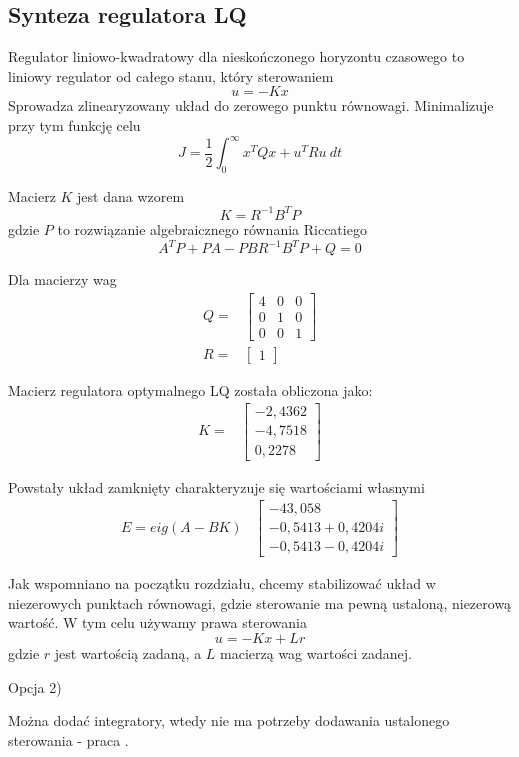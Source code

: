 \subsection{Synteza regulatora LQ}

Regulator liniowo-kwadratowy dla nieskończonego horyzontu czasowego to liniowy regulator od całego stanu, który sterowaniem
\begin{equation}
u = -Kx
\end{equation}
Sprowadza zlinearyzowany układ do zerowego punktu równowagi. Minimalizuje przy tym funkcję celu
\begin{equation}
J = \dfrac{1}{2} \int _0^{\infty} {x^T Q x + u^T R u}\: dt
\end{equation}

Macierz $K$ jest dana wzorem
\begin{equation}
K = R^{-1}B^T P
\end{equation}
gdzie $P$ to rozwiązanie algebraicznego równania Riccatiego
\begin{equation}
A^T P + PA -PBR^{-1}B^T P + Q = 0
\end{equation}

Dla macierzy wag
\[
\begin{array}{lc}
Q = &
\begin{bmatrix} 4 & 0 & 0 \\
0 & 1 & 0 \\
0 & 0 & 1
\end{bmatrix}
\\
R = & \begin{bmatrix}
1
\end{bmatrix}
\end{array}
\]
    
Macierz regulatora optymalnego LQ została obliczona jako:
\[
\begin{array}{lc}
K = &
\begin{bmatrix}
 -2,4362 \\  -4,7518  \\  0,2278
\end{bmatrix}
\end{array}
\]

Powstały układ zamknięty charakteryzuje się wartościami własnymi
\[
\begin{array}{lc}
E = eig(A-BK) &
\begin{bmatrix}
  -43,058 \\
  -0,5413 + 0,4204i \\
  -0,5413 - 0,4204i
\end{bmatrix}
\end{array}
\]

Jak wspomniano na początku rozdziału, chcemy stabilizować układ w niezerowych punktach równowagi, gdzie sterowanie ma pewną ustaloną, niezerową wartość. W tym celu używamy prawa sterowania
\begin{equation}
u = -Kx + Lr
\end{equation}
gdzie $r$ jest wartością zadaną, a $L$ macierzą wag wartości zadanej.

Opcja 2)

Można dodać integratory, wtedy nie ma potrzeby dodawania ustalonego sterowania - praca \cite{ReferenceTrackLQR}.





